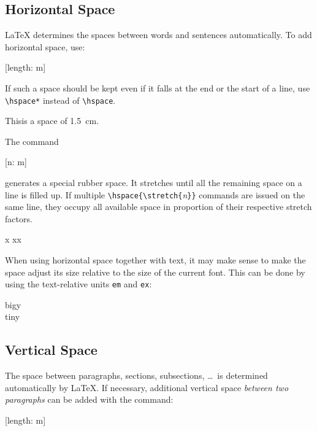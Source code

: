 \subsection{Horizontal Space}\label{sec:hspace}

\LaTeX{} determines the spaces between words and sentences
automatically. To add horizontal space, use:
\begin{lscommand}
  [length: m]
\end{lscommand}
If such a space should be kept even if it falls at the end or the
start of a line, use \verb|\hspace*| instead of \verb|\hspace|.

\begin{example}
This\hspace{1.5cm}is a space
of \qty{1.5}{\cm}.
\end{example}

The command
\begin{lscommand}
  [n: m]
\end{lscommand}
\noindent generates a special rubber space. It stretches until all the
remaining space on a line is filled up. If multiple
\verb|\hspace{\stretch{|\emph{n}\verb|}}| commands are issued on the same
line, they occupy all available space in proportion of their respective
stretch factors.

\begin{example}
x
xx
\end{example}

When using horizontal space together with text, it may make sense to make
the space adjust its size relative to the size of the current font.
This can be done by using the text-relative units \texttt{em} and
\texttt{ex}:

\begin{example}
{\Large{}big\hspace{1em}y}\\
{\tiny{}tin\hspace{1em}y}
\end{example}

\subsection{Vertical Space}
The space between paragraphs, sections, subsections, \ldots\ is
determined automatically by \LaTeX. If necessary, additional vertical
space \emph{between two paragraphs} can be added with the command:
\begin{lscommand}
  [length: m]
\end{lscommand}

